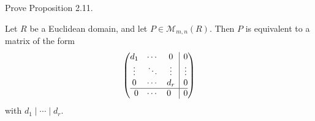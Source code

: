 \documentclass[../../master.tex]{subfiles}
\begin{document}
\begin{problem}
    Prove Proposition 2.11.
    \begin{proposition}[Proposition 2.11] 
        Let $R$ be a Euclidean domain, and let $P \in \mathcal{M}_{m,n}(R)$.
        Then $P$ is equivalent to a matrix of the form
        \[
        \left(
            \begin{array}{@{}c|c@{}}
                \begin{matrix}
                    d_1 & \cdots & 0 \\
                    \vdots & \ddots & \vdots \\
                    0 & \cdots & d_r
                \end{matrix} &
                \begin{matrix}
                    0 \\
                    \vdots \\
                    0
                \end{matrix} \\
                \hline
                \begin{matrix}
                    0 & \cdots & 0
                \end{matrix} & 0
            \end{array}
        \right)
        \]
        with $d_1 \mid \cdots \mid d_r$.
    \end{proposition}
\end{problem}
\end{document}
